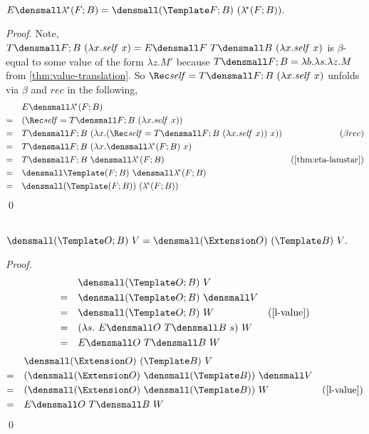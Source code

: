 \begin{lemma}
  \label{thm:unfold-lamstar}
    $ E\den{ \lamstar (F; B)} = \den{(\Template F; B) ~ (\lamstar (F; B))}.$
\end{lemma}
\begin{proof}
  Note,
  \begin{math}
    T\den{F; B} ~ (\lambda x. \mathit{self} ~ x)
    =
    E\den{F} ~ T\den{B} ~ (\lambda x. \mathit{self} ~ x)    
  \end{math}
  is $\beta$-equal to some value of the form $\lambda z. M'$ because
  $T\den{F; B} = \lambda b. \lambda s. \lambda z. M$ from
  \cref{thm:value-translation}.  So
  $\Rec \mathit{self} = T\den{F; B} ~ (\lambda x. \mathit{self} ~ x)$ unfolds
  via $\beta$ and $rec$ in the following,
  \begin{align*}
    &\quad
    E\den{ \lamstar (F; B)}
    \\
    =& \quad
    (\Rec \mathit{self} = T\den{F; B} ~ (\lambda x. \mathit{self} ~ x))
    \\
    =& \quad
    T\den{F; B}
    ~
    (\lambda x.
    (\Rec \mathit{self} = T\den{F; B} ~ (\lambda x. \mathit{self} ~ x))
    ~ x)
    )
    & (\beta rec)
    \\
    =& \quad
    T\den{F; B} ~ (\lambda x. \den{\lamstar(F; B)} ~ x)
    \\
    =& \quad
    T\den{F; B} ~ \den{\lamstar(F; B)}
    & (\cref{thm:eta-lamstar})
    \\
    =& \quad
    \den{\Template (F; B)} ~ \den{\lamstar (F; B)}
    \\
    =& \quad
    \den{(\Template (F; B)) ~ (\lamstar (F; B))}
  \end{align*}
  \qed
\end{proof}

\begin{lemma}
  \label{thm:templ-ext}
  \\
  $ \den{(\Template O; B) ~ V} = \den{(\Extension O) ~ (\Template B) ~ V}.$
\end{lemma}
    \begin{proof}
        \begin{align*}
            &\quad \den{(\Template O; B) ~ V} \\
            =& \quad \den{(\Template O; B)} ~ \den{V} \\
            =& \quad \den{(\Template O; B)} ~ W & (\cref{l-value}) \\
            =& \quad (\lambda s. ~E\den{O} ~T\den{B} ~s) ~ W \\
            =& \quad E\den{O} ~T\den{B} ~W
        \end{align*}
        \begin{align*}
            &\quad  \den{(\Extension O) ~ (\Template B) ~ V} \\
            =& \quad (\den{(\Extension O)} ~ \den{(\Template B)}) ~ \den{V} \\
            =& \quad (\den{(\Extension O)} ~ \den{(\Template B)}) ~ W & (\cref{l-value})\\
            =& \quad E\den{O} ~ T\den{B} ~ W
        \end{align*}
        \qed
    \end{proof}

